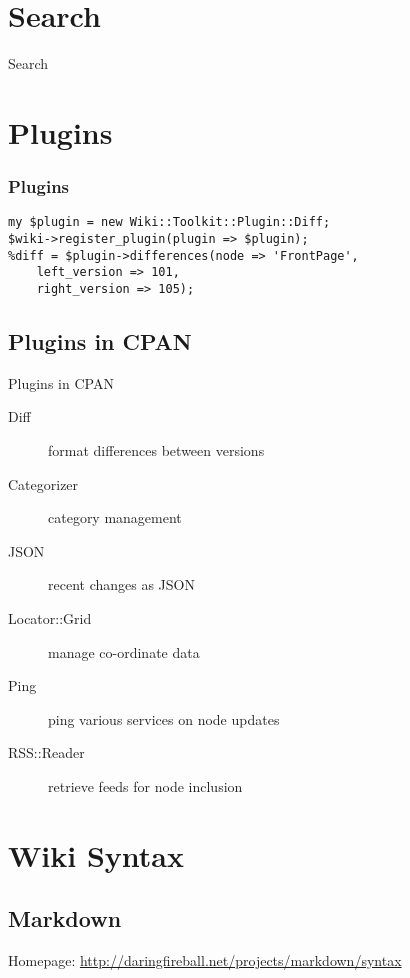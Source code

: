 \section{Search}

\begin{frame}{Search}
\end{frame}

\section{Plugins}


\begin{frame}[fragile]
\frametitle{Plugins}
\begin{lstlisting}
my $plugin = new Wiki::Toolkit::Plugin::Diff;
$wiki->register_plugin(plugin => $plugin);
%diff = $plugin->differences(node => 'FrontPage',
    left_version => 101,
    right_version => 105);
\end{lstlisting}
\end{frame}

\subsection{Plugins in CPAN}

\begin{frame}{Plugins in CPAN}
 \begin{description}
  \item[Diff] format differences between versions
  \item[Categorizer] category management
  \item[JSON] recent changes as JSON
  \item[Locator::Grid] manage co-ordinate data
  \item[Ping] ping various services on node updates
  \item[RSS::Reader] retrieve feeds for node inclusion
 \end{description}
\end{frame}

\section{Wiki Syntax}
\subsection{Markdown}
Homepage: \url{http://daringfireball.net/projects/markdown/syntax}

